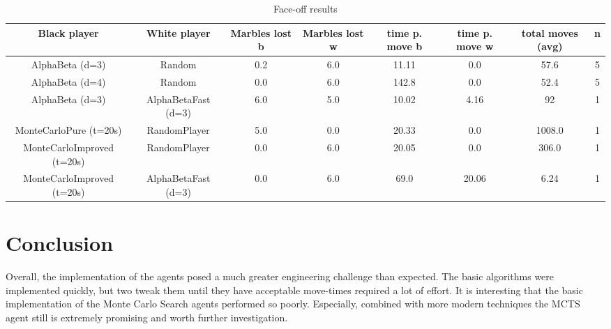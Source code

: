\documentclass{llncs}
\begin{document}
\begin{table}
	\begin{adjustwidth}{-5in}{-5in}%
		\begin{center}
			\begin{tabular}{ | c | c | c | c | c | c | c | c | }
				\hline
				Black player               & White player        & \small{Marbles lost b} & \small{Marbles lost w} & \small{time p. move b} & \small{time p. move w} & \small{total moves (avg)} & n \\
				\hline
				AlphaBeta (d=3)            & Random              & 0.2                    & 6.0                    & 11.11                  & 0.0                    & 57.6                      & 5 \\
				\hline
				AlphaBeta (d=4)            & Random              & 0.0                    & 6.0                    & 142.8                  & 0.0                    & 52.4                      & 5 \\
				\hline
				AlphaBeta (d=3)            & AlphaBetaFast (d=3) & 6.0                    & 5.0                    & 10.02                  & 4.16                   & 92                        & 1 \\
				\hline
				MonteCarloPure (t=20s)     & RandomPlayer        & 5.0                    & 0.0                    & 20.33                  & 0.0                    & 1008.0                    & 1 \\
				\hline
				MonteCarloImproved (t=20s) & RandomPlayer        & 0.0                    & 6.0                    & 20.05                  & 0.0                    & 306.0                     & 1 \\
				\hline
				MonteCarloImproved (t=20s) & AlphaBetaFast (d=3) & 0.0                    & 6.0                    & 69.0                   & 20.06                  & 6.24                      & 1 \\
				\hline
			\end{tabular}
		\end{center}
		\label{node_count}
	\end{adjustwidth}
	\medskip%
	\caption{Face-off results}
\end{table}

\section{Conclusion}
Overall, the implementation of the agents posed a much greater engineering challenge than expected. The basic algorithms were implemented quickly, but two tweak them until they have acceptable move-times required a lot of effort. It is interesting that the basic implementation of the Monte Carlo Search agents performed so poorly. Especially, combined with more modern techniques the MCTS agent still is extremely promising and worth further investigation.




\end{document}
